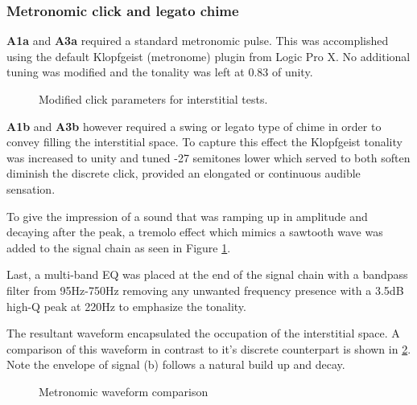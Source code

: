 \subsubsection{Metronomic click and legato chime}
\textbf{A1a} and \textbf{A3a} required a standard metronomic pulse. This was accomplished using the default Klopfgeist (metronome) plugin from Logic Pro X. No additional tuning was modified and the tonality was left at 0.83 of unity.

\begin{figure}[H]
    \centering
    \caption{Modified click parameters for interstitial tests.}
        \qquad
        \qquad
    \label{fig:modClick}
\end{figure}

\textbf{A1b} and \textbf{A3b} however required a swing or legato type of chime in order to convey filling the interstitial space. To capture this effect the Klopfgeist tonality was increased to unity and tuned -27 semitones lower which served to both soften diminish the discrete click, provided an elongated or continuous audible sensation. 

To give the impression of a sound that was ramping up in amplitude and decaying after the peak, a tremolo effect which mimics a sawtooth wave was added to the signal chain as seen in Figure \ref{fig:modClick}. 

Last, a multi-band EQ was placed at the end of the signal chain with a bandpass filter from 95Hz-750Hz removing any unwanted frequency presence with a 3.5dB high-Q peak at 220Hz to emphasize the tonality.

The resultant waveform encapsulated the occupation of the interstitial space. A comparison of this waveform in contrast to it's discrete counterpart is shown in \ref{fig:click_comparison}. Note the envelope of signal (b) follows a natural build up and decay.

\begin{figure}[H]
    \centering
    \caption{Metronomic waveform comparison}
    \label{fig:click_comparison}
\end{figure}

